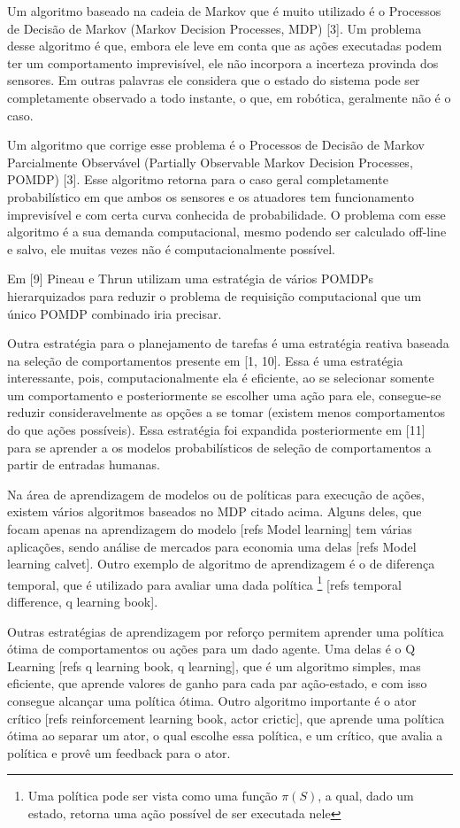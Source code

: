 Um algoritmo baseado na cadeia de Markov que é muito utilizado é o Processos de Decisão de Markov (Markov Decision Processes, MDP) [3]. Um problema desse algoritmo é que, embora ele leve em conta que as ações executadas podem ter um comportamento imprevisível, ele não incorpora a incerteza provinda dos sensores. Em outras palavras ele considera que o estado do sistema pode ser completamente observado a todo instante, o que, em robótica, geralmente não é o caso.

Um algoritmo que corrige esse problema é o Processos de Decisão de Markov Parcialmente Observável (Partially Observable Markov Decision Processes, POMDP) [3]. Esse algoritmo retorna para o caso geral completamente probabilístico em que ambos os sensores e os atuadores tem funcionamento imprevisível e com certa curva conhecida de probabilidade. O problema com esse algoritmo é a sua demanda computacional, mesmo podendo ser calculado off-line e salvo, ele muitas vezes não é computacionalmente possível.

Em [9] Pineau e Thrun utilizam uma estratégia de vários POMDPs hierarquizados para reduzir o problema de requisição computacional que um único POMDP combinado iria precisar.

Outra estratégia para o planejamento de tarefas é uma estratégia reativa baseada na seleção de comportamentos presente em [1, 10]. Essa é uma estratégia interessante, pois, computacionalmente ela é eficiente, ao se selecionar somente um comportamento e posteriormente se escolher uma ação para ele, consegue-se reduzir consideravelmente as opções a se tomar (existem menos comportamentos do que ações possíveis). Essa estratégia foi expandida posteriormente em [11] para se aprender a os modelos probabilísticos de seleção de comportamentos a partir de entradas humanas.

Na área de aprendizagem de modelos ou de políticas para execução de ações, existem vários algoritmos baseados no MDP citado acima. Alguns deles, que focam apenas na aprendizagem do modelo [refs Model learning] tem várias aplicações, sendo análise de mercados para economia uma delas [refs Model learning calvet]. Outro exemplo de algoritmo de aprendizagem é o de diferença temporal, que é utilizado para avaliar uma dada política%
\footnote{Uma política pode ser vista como uma função $ \pi \left( S \right) $, a qual, dado um estado, retorna uma ação possível de ser executada nele%
}
[refs temporal difference, q learning book].

Outras estratégias de aprendizagem por reforço permitem aprender uma política ótima de comportamentos ou ações para um dado agente. Uma delas é o Q Learning [refs q learning book, q learning], que é um algoritmo simples, mas eficiente, que aprende valores de ganho para cada par ação-estado, e com isso consegue alcançar uma política ótima. Outro algoritmo importante é o ator crítico [refs reinforcement learning book, actor crictic], que aprende uma política ótima ao separar um ator, o qual escolhe essa política, e um crítico, que avalia a política e provê um feedback para o ator.

